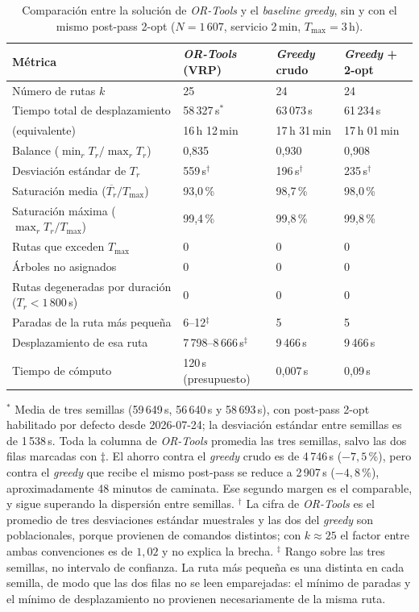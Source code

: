 \begin{table}[H]
  \centering
  \caption{Comparación entre la solución de \textit{OR-Tools} y el \textit{baseline} \textit{greedy}, sin y con el mismo post-pass 2-opt ($N=1\,607$, servicio 2\,min, $T_{\max}=3$\,h).}
  \label{tab:comparativa}
  \begin{tabularx}{\textwidth}{lXXX}
    \toprule
    Métrica & \textit{OR-Tools} (VRP) & \textit{Greedy} crudo & \textit{Greedy} + 2-opt \\
    \midrule
    Número de rutas $k$ & 25 & 24 & 24 \\
    Tiempo total de desplazamiento & 58\,327\,s$^*$ & 63\,073\,s & 61\,234\,s \\
    \phantom{Tiempo total} (equivalente) & 16\,h 12\,min & 17\,h 31\,min & 17\,h 01\,min \\
    Balance ($\min_r T_r / \max_r T_r$) & 0,835 & 0,930 & 0,908 \\
    Desviación estándar de $T_r$ & 559\,s$^\dagger$ & 196\,s$^\dagger$ & 235\,s$^\dagger$ \\
    Saturación media ($\overline{T_r}/T_{\max}$) & 93,0\,\% & 98,7\,\% & 98,0\,\% \\
    Saturación máxima ($\max_r T_r/T_{\max}$) & 99,4\,\% & 99,8\,\% & 99,8\,\% \\
    Rutas que exceden $T_{\max}$ & 0 & 0 & 0 \\
    Árboles no asignados & 0 & 0 & 0 \\
    Rutas degeneradas por duración ($T_r < 1\,800$\,s) & 0 & 0 & 0 \\
    Paradas de la ruta más pequeña & 6--12$^\ddagger$ & 5 & 5 \\
    Desplazamiento de esa ruta & 7\,798--8\,666\,s$^\ddagger$ & 9\,466\,s & 9\,466\,s \\
    Tiempo de cómputo & 120\,s (presupuesto) & 0,007\,s & 0,09\,s \\
    \bottomrule
  \end{tabularx}
\end{table}

{\footnotesize$^*$ Media de tres semillas (59\,649\,s, 56\,640\,s y 58\,693\,s), con
post-pass 2-opt habilitado por defecto desde 2026-07-24; la desviación estándar entre
semillas es de 1\,538\,s. Toda la columna de \textit{OR-Tools} promedia las tres
semillas, salvo las dos filas marcadas con $\ddagger$. El ahorro contra el
\textit{greedy} crudo es de 4\,746\,s
($-7{,}5$\,\%), pero contra el \textit{greedy} que recibe el mismo post-pass se reduce a
2\,907\,s ($-4{,}8$\,\%), aproximadamente 48 minutos de caminata. Ese segundo margen es el
comparable, y sigue superando la dispersión entre semillas.
$^\dagger$ La cifra de \textit{OR-Tools} es el promedio de tres desviaciones estándar
muestrales y las dos del
\textit{greedy} son poblacionales, porque provienen de comandos distintos; con
$k \approx 25$ el factor entre ambas convenciones es de $1{,}02$ y no explica la brecha.
$^\ddagger$ Rango sobre las tres semillas, no intervalo de confianza. La ruta más pequeña
es una distinta en cada semilla, de modo que las dos filas no se leen emparejadas: el
mínimo de paradas y el mínimo de desplazamiento no provienen necesariamente de la misma
ruta.}

